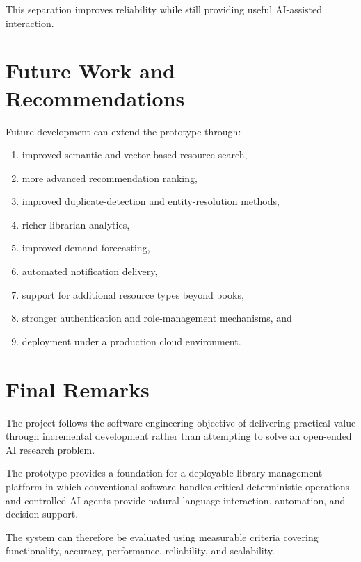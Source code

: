\documentclass{tietreport}
\begin{document}
This separation improves reliability while still providing useful
AI-assisted interaction.

\section{Future Work and Recommendations}

Future development can extend the prototype through:

\begin{enumerate}

    \item improved semantic and vector-based resource search,

    \item more advanced recommendation ranking,

    \item improved duplicate-detection and entity-resolution methods,

    \item richer librarian analytics,

    \item improved demand forecasting,

    \item automated notification delivery,

    \item support for additional resource types beyond books,

    \item stronger authentication and role-management mechanisms, and

    \item deployment under a production cloud environment.

\end{enumerate}

\section{Final Remarks}

The project follows the software-engineering objective of delivering
practical value through incremental development rather than attempting to
solve an open-ended AI research problem.

The prototype provides a foundation for a deployable library-management
platform in which conventional software handles critical deterministic
operations and controlled AI agents provide natural-language interaction,
automation, and decision support.

The system can therefore be evaluated using measurable criteria covering
functionality, accuracy, performance, reliability, and scalability.
\end{document}

